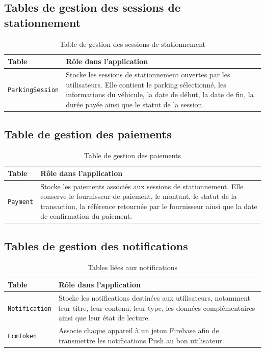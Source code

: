 \subsection{Tables de gestion des sessions de stationnement}

\begin{table}[H]
\centering
\small
\renewcommand{\arraystretch}{1.25}
\begin{tabular}{|p{}|p{}|}
\hline
\textbf{Table} & \textbf{Rôle dans l'application} \\
\hline
\texttt{ParkingSession} & Stocke les sessions de stationnement ouvertes par les utilisateurs. Elle contient le parking sélectionné, les informations du véhicule, la date de début, la date de fin, la durée payée ainsi que le statut de la session. \\
\hline
\end{tabular}
\caption{Table de gestion des sessions de stationnement}
\label{tab:parking_session_table}
\end{table}

\subsection{Table de gestion des paiements}

\begin{table}[H]
\centering
\small
\renewcommand{\arraystretch}{1.25}
\begin{tabular}{|p{}|p{}|}
\hline
\textbf{Table} & \textbf{Rôle dans l'application} \\
\hline
\texttt{Payment} & Stocke les paiements associés aux sessions de stationnement. Elle conserve le fournisseur de paiement, le montant, le statut de la transaction, la référence retournée par le fournisseur ainsi que la date de confirmation du paiement. \\
\hline
\end{tabular}
\caption{Table de gestion des paiements}
\label{tab:payment_table}
\end{table}

\subsection{Tables de gestion des notifications}

\begin{table}[H]
\centering
\small
\renewcommand{\arraystretch}{1.25}
\begin{tabular}{|p{}|p{}|}
\hline
\textbf{Table} & \textbf{Rôle dans l'application} \\
\hline
\texttt{Notification} & Stocke les notifications destinées aux utilisateurs, notamment leur titre, leur contenu, leur type, les données complémentaires ainsi que leur état de lecture. \\
\hline
\texttt{FcmToken} & Associe chaque appareil à un jeton Firebase afin de transmettre les notifications Push au bon utilisateur. \\
\hline
\end{tabular}
\caption{Tables liées aux notifications}
\label{tab:notification_tables}
\end{table}

